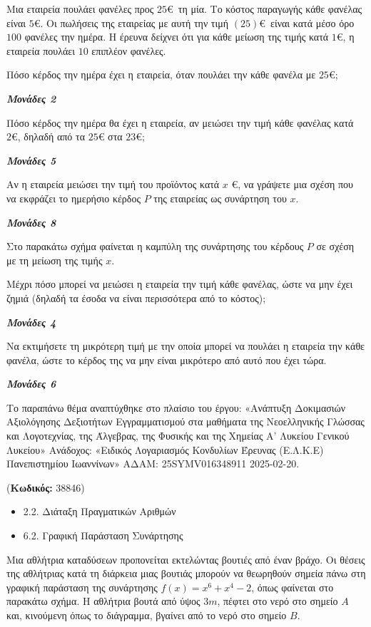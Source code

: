\documentclass[11pt,a4paper,twoside]{book}
\newcounter{askhsh}[chapter]
\renewcommand{\theaskhsh}{
	\bf{\titlefont{\Large{\thechapter}}.\arabic{askhsh}}
}
\newcommand{\Askhsh}[2]{\refstepcounter{askhsh}{\titlefont{Άσκηση\theaskhsh} - \textcolor{maincolor}{ΘΕΜΑ #2}} ({\small{\textbf{Κωδικός:} #1}})\\}{}
\newenvironment{ylh}{
\begin{tcolorbox}[
breakable,
enhanced standard,
titlerule=0pt,
toprule=0pt, 
rightrule=0pt, 
bottomrule=0pt,
title={\titlefont Ύλη άσκησης},
colback=white,
opacityback=0,
left=2mm,
top=1mm,
bottom=0mm,
boxrule=0pt,
colframe=white,
borderline west={1.5mm}{0pt}{secondarycolor},
leftrule=2mm,
sharp corners,
coltitle=black
]
\begin{itemize}[leftmargin=3mm, itemsep=0mm, label=\textcolor{secondarycolor}{{\small\faBook}}]
}{
\end{itemize}
\end{tcolorbox}
}
\newcommand{\monades}[1]{
\hspace*{\fill}
\textbf{\textit{\textcolor{maincolor}{Μονάδες #1}}}}
\begin{document}
Μια εταιρεία πουλάει φανέλες προς $25$\euro\ τη μία. Το κόστος παραγωγής κάθε φανέλας είναι $5\euro$. Οι πωλήσεις της εταιρείας με αυτή την τιμή $(25)$\euro\ είναι κατά μέσο όρο $100$ φανέλες την ημέρα. Η έρευνα δείχνει ότι για κάθε μείωση της τιμής κατά $1$\euro, η εταιρεία πουλάει $10$ επιπλέον φανέλες.
\begin{alist}
\item Πόσο κέρδος την ημέρα έχει η εταιρεία, όταν πουλάει την κάθε φανέλα με $25$\euro;
\monades{2}
\item Πόσο κέρδος την ημέρα θα έχει η εταιρεία, αν μειώσει την τιμή κάθε φανέλας κατά $2\euro$, δηλαδή από τα $25\euro$ στα $23$\euro;
\monades{5}
\item Αν η εταιρεία μειώσει την τιμή του προϊόντος κατά $x$ \euro, να γράψετε μια σχέση που να εκφράζει το ημερήσιο κέρδος $P$ της εταιρείας ως συνάρτηση του $x$.
\monades{8}
\item Στο παρακάτω σχήμα φαίνεται η καμπύλη της συνάρτησης του κέρδους $P$ σε σχέση με τη μείωση της τιμής $x$.
\begin{rlist}
\item
  Μέχρι πόσο μπορεί να μειώσει η εταιρεία την τιμή κάθε φανέλας, ώστε να μην έχει ζημιά (δηλαδή τα έσοδα να είναι περισσότερα από το κόστος);
\monades{4}
\item
  Να εκτιμήσετε τη μικρότερη τιμή με την οποία μπορεί να πουλάει η εταιρεία την κάθε φανέλα, ώστε το κέρδος της να μην είναι μικρότερο από αυτό που έχει τώρα.
\monades{6}
\end{rlist}
\end{alist}
{\footnotesize Το παραπάνω θέμα αναπτύχθηκε στο πλαίσιο του έργου: «Ανάπτυξη Δοκιμασιών Αξιολόγησης Δεξιοτήτων Εγγραμματισμού στα μαθήματα της Νεοελληνικής Γλώσσας και Λογοτεχνίας, της Άλγεβρας, της Φυσικής και της Χημείας Α' Λυκείου Γενικού Λυκείου» Ανάδοχος: «Ειδικός Λογαριασμός Κονδυλίων Έρευνας (Ε.Λ.Κ.Ε) Πανεπιστημίου Ιωαννίνων» ΑΔΑΜ: 25SYMV016348911 2025-02-20.}
\vspace{4mm}


\vspace{4mm}
\Askhsh{38846}{4}
\begin{ylh}
    \item 2.2. Διάταξη Πραγματικών Αριθμών
    \item 6.2. Γραφική Παράσταση Συνάρτησης
\end{ylh}

Mια αθλήτρια καταδύσεων προπονείται εκτελώντας βουτιές από έναν βράχο. Οι θέσεις της αθλήτριας κατά τη διάρκεια μιας βουτιάς μπορούν να θεωρηθούν σημεία πάνω στη γραφική παράσταση της συνάρτησης $f(x) = x^{6} + x^{4} - 2$, όπως φαίνεται στο παρακάτω σχήμα. Η αθλήτρια βουτά από ύψος $3m$, πέφτει στο νερό στο σημείο $Α$ και, κινούμενη όπως το διάγραμμα, βγαίνει από το νερό στο σημείο $Β$.
\end{document}

